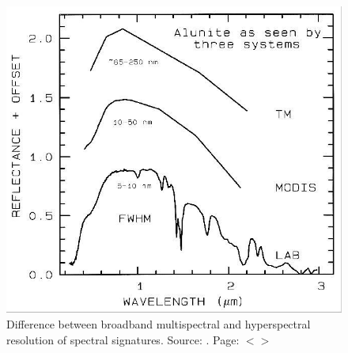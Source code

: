 \documentclass[11pt]{article}
\begin{document}
\begin{figure}[H]
	\centering
	\includegraphics[scale=0.25]{Fig-12.jpg}
	\caption{Difference between broadband multispectral and hyperspectral resolution of
		spectral signatures. Source: \cite{Clark99}\label{Clark99}. Page: $<$\pageref{page-20}$>$}
	\label{fig:2.3}
\end{figure}
\end{document}
